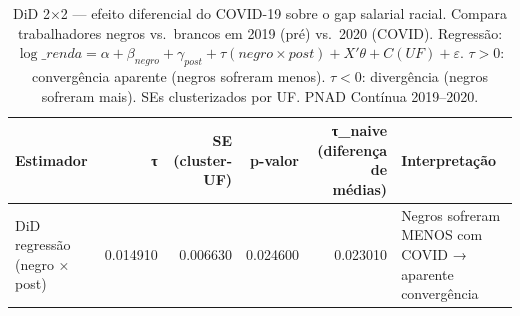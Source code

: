 \begin{table}
\caption{DiD 2$\times$2 — efeito diferencial do COVID-19 sobre o gap salarial racial. Compara trabalhadores negros vs.\ brancos em 2019 (pré) vs.\ 2020 (COVID). Regressão: $\log\_renda = \alpha + \beta_{negro} + \gamma_{post} + \tau (negro \times post) + X'\theta + C(UF) + \varepsilon$. $\tau > 0$: convergência aparente (negros sofreram menos). $\tau < 0$: divergência (negros sofreram mais). SEs clusterizados por UF. PNAD Contínua 2019--2020.}
\label{tab:did_covid}
\begin{tabular}{lrrrrl}
\toprule
Estimador & τ & SE (cluster-UF) & p-valor & τ\_naive (diferença de médias) & Interpretação \\
\midrule
DiD regressão (negro × post) & 0.014910 & 0.006630 & 0.024600 & 0.023010 & Negros sofreram MENOS com COVID → aparente convergência \\
\bottomrule
\end{tabular}
\end{table}
